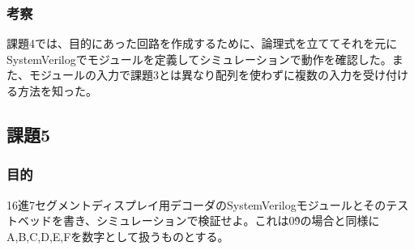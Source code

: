 \documentclass[a4paper]{jarticle}
\begin{document}
\subsubsection{考察}
課題4では、目的にあった回路を作成するために、論理式を立ててそれを元にSystemVerilogでモジュールを定義してシミュレーションで動作を確認した。また、モジュールの入力で課題3とは異なり配列を使わずに複数の入力を受け付ける方法を知った。
\subsection{課題5}
\subsubsection{目的}
16進7セグメントディスプレイ用デコーダのSystemVerilogモジュールとそのテストベッドを書き、シミュレーションで検証せよ。これは0\~9の場合と同様にA,B,C,D,E,Fを数字として扱うものとする。
\end{document}

